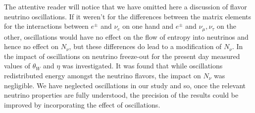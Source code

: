 The attentive reader will notice that we have omitted here a discussion of flavor neutrino oscillations. If it weren't for the differences between the matrix elements for the interactions between $e^\pm$ and $\nu_e$ on one hand and $e^\pm$ and $\nu_\mu,\nu_\tau$ on the other, oscillations would have no effect on the flow of entropy into neutrinos and hence no effect on $N_\nu$, but these differences do lead to a modification of $N_\nu$.  In \cite{Mangano2005} the impact of oscillations on neutrino freeze-out for the present day measured values of $\theta_W$ and $\eta$ was investigated.  It was found  that while oscillations redistributed energy amongst the neutrino flavors, the impact on $N_\nu$ was negligible. We have neglected oscillations in our study and so, once the relevant neutrino properties are fully understood, the precision of the results could be improved by incorporating the effect of oscillations.



